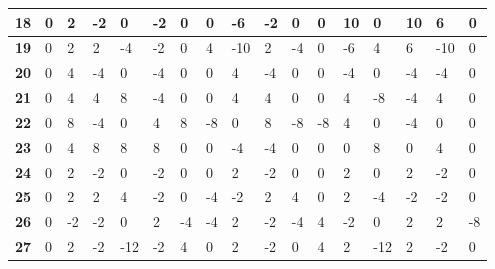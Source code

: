 \begin{longtable}[c]{|l|l|l|l|l|l|l|l|l|l|l|l|l|l|l|l|l|}
\textbf{18} & 0          & 2          & -2         & 0          & -2         & 0          & 0          & -6         & -2         & 0          & 0           & 10          & 0           & 10          & 6           & 0           \\ \hline
\textbf{19} & 0          & 2          & 2          & -4         & -2         & 0          & 4          & -10        & 2          & -4         & 0           & -6          & 4           & 6           & -10         & 0           \\ \hline
\textbf{20} & 0          & 4          & -4         & 0          & -4         & 0          & 0          & 4          & -4         & 0          & 0           & -4          & 0           & -4          & -4          & 0           \\ \hline
\textbf{21} & 0          & 4          & 4          & 8          & -4         & 0          & 0          & 4          & 4          & 0          & 0           & 4           & -8          & -4          & 4           & 0           \\ \hline
\textbf{22} & 0          & 8          & -4         & 0          & 4          & 8          & -8         & 0          & 8          & -8         & -8          & 4           & 0           & -4          & 0           & 0           \\ \hline
\textbf{23} & 0          & 4          & 8          & 8          & 8          & 0          & 0          & -4         & -4         & 0          & 0           & 0           & 8           & 0           & 4           & 0           \\ \hline
\textbf{24} & 0          & 2          & -2         & 0          & -2         & 0          & 0          & 2          & -2         & 0          & 0           & 2           & 0           & 2           & -2          & 0           \\ \hline
\textbf{25} & 0          & 2          & 2          & 4          & -2         & 0          & -4         & -2         & 2          & 4          & 0           & 2           & -4          & -2          & -2          & 0           \\ \hline
\textbf{26} & 0          & -2         & -2         & 0          & 2          & -4         & -4         & 2          & -2         & -4         & 4           & -2          & 0           & 2           & 2           & -8          \\ \hline
\textbf{27} & 0          & 2          & -2         & -12        & -2         & 4          & 0          & 2          & -2         & 0          & 4           & 2           & -12         & 2           & -2          & 0           \\ \hline

\end{longtable}

